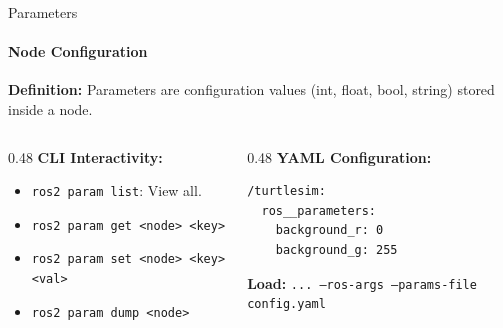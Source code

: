 \documentclass[aspectratio=169]{beamer}
\begin{document}
\begin{frame}[fragile]{Parameters}
    \framesubtitle{Node Configuration}
    \textbf{Definition:} Parameters are configuration values (int, float, bool, string) stored inside a node.
    
    \begin{columns}[T]
        \begin{column}{0.48\textwidth}
            \textbf{CLI Interactivity:}
            \begin{itemize}
                \item \texttt{ros2 param list}: View all.
                \item \texttt{ros2 param get <node> <key>}
                \item \texttt{ros2 param set <node> <key> <val>}
                \item \texttt{ros2 param dump <node>}
            \end{itemize}
        \end{column}
        \begin{column}{0.48\textwidth}
            \textbf{YAML Configuration:}
            \scriptsize
\begin{verbatim}
/turtlesim:
  ros__parameters:
    background_r: 0
    background_g: 255
\end{verbatim}
            \footnotesize
            \textbf{Load:} \texttt{... --ros-args --params-file config.yaml}
        \end{column}
    \end{columns}
\end{frame}
\end{document}
